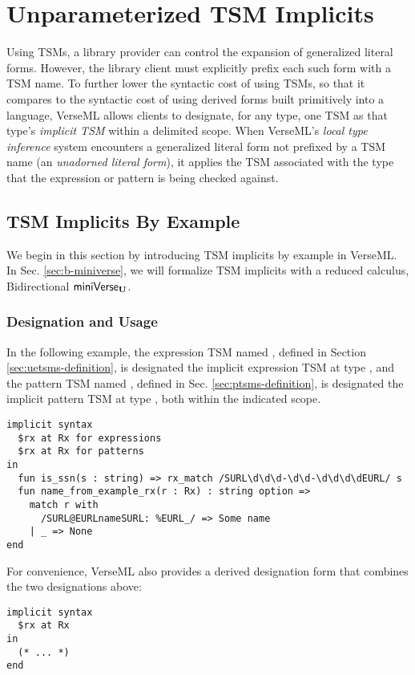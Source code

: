 \chapter{Unparameterized TSM Implicits}\label{chap:tsls}
Using TSMs, a library provider can control the expansion of generalized literal forms. However, the library client must explicitly prefix each such form with a TSM name. To further lower the syntactic cost of using TSMs, so that it compares to the syntactic cost of using derived forms built primitively into a language, VerseML allows clients to designate, for any type, one TSM as that type's \emph{implicit TSM} within a delimited scope. When VerseML's \emph{local type inference} system encounters a generalized literal form not prefixed by a TSM name (an \emph{unadorned literal form}), it applies the TSM associated with the type that the expression or pattern is being checked against.

\section{TSM Implicits By Example}\label{sec:tsm-implicits-by-example}
We begin in this section by introducing TSM implicits by example in VerseML. In Sec. \ref{sec:b-miniverse}, we will formalize TSM implicits with a reduced calculus, {Bidirectional} $\mathsf{miniVerse}_\textbf{U}$. 

\subsection{Designation and Usage}
In the following example, the expression TSM named , defined in Section \ref{sec:uetsms-definition}, is designated the implicit expression TSM at type , and the pattern TSM named , defined in Sec. \ref{sec:ptsms-definition}, is designated the implicit pattern TSM at type ,  both within the indicated scope.  %
\begin{lstlisting}
implicit syntax 
  $rx at Rx for expressions
  $rx at Rx for patterns
in
  fun is_ssn(s : string) => rx_match /SURL\d\d\d-\d\d-\d\d\d\dEURL/ s
  fun name_from_example_rx(r : Rx) : string option => 
    match r with 
      /SURL@EURLnameSURL: %EURL_/ => Some name
    | _ => None
end
\end{lstlisting}
For convenience, VerseML also provides a derived designation form that combines the two designations above:
\begin{lstlisting}[numbers=none]
implicit syntax 
  $rx at Rx 
in 
  (* ... *)
end 
\end{lstlisting}

